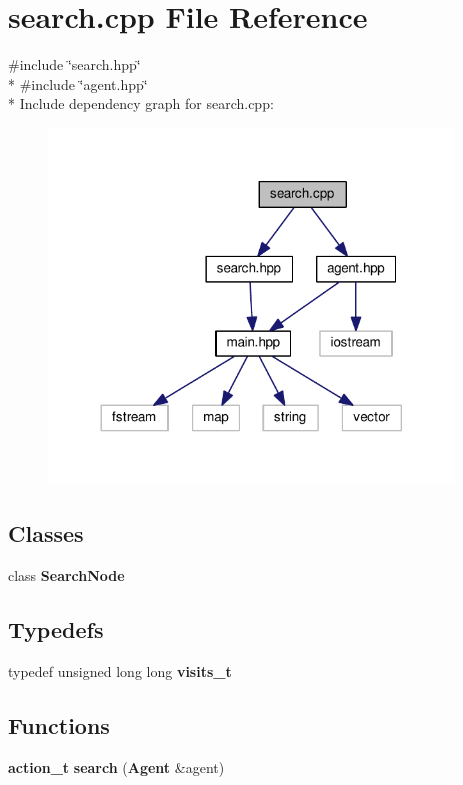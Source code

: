 \section{search.\+cpp File Reference}
\label{search_8cpp}
{\ttfamily \#include \char`\"{}search.\+hpp\char`\"{}}\\*
{\ttfamily \#include \char`\"{}agent.\+hpp\char`\"{}}\\*
Include dependency graph for search.\+cpp\+:
\nopagebreak
\begin{figure}[H]
\begin{center}
\leavevmode
\includegraphics[width=305pt]{search_8cpp__incl}
\end{center}
\end{figure}
\subsection*{Classes}
\begin{DoxyCompactItemize}
\item 
class {\bf Search\+Node}
\end{DoxyCompactItemize}
\subsection*{Typedefs}
\begin{DoxyCompactItemize}
\item 
typedef unsigned long long {\bf visits\+\_\+t}
\end{DoxyCompactItemize}
\subsection*{Functions}
\begin{DoxyCompactItemize}
\item 
{\bf action\+\_\+t} {\bf search} ({\bf Agent} \&agent)
\end{DoxyCompactItemize}


